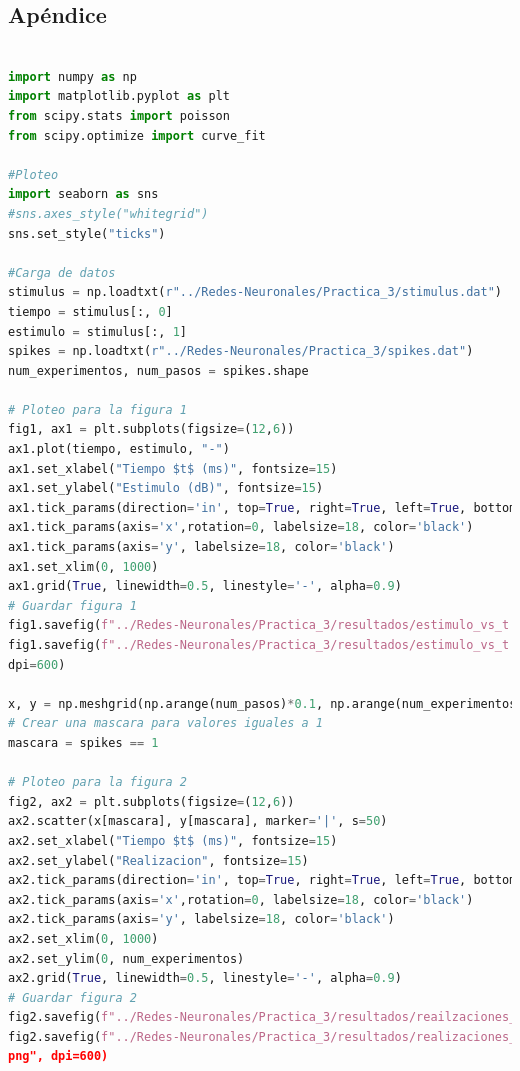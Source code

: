 \documentclass[11pt,twocolumn,twoside]{opticajnl}
\begin{document}
\begin{onecolumn} %
\appendix
\section{Apéndice \label{codigo}}

\begin{lstlisting}[language=Python, caption={Implementación del método Runge-Kutta 4.}, label=python-code]

import numpy as np
import matplotlib.pyplot as plt
from scipy.stats import poisson
from scipy.optimize import curve_fit

#Ploteo 
import seaborn as sns
#sns.axes_style("whitegrid")
sns.set_style("ticks")

#Carga de datos
stimulus = np.loadtxt(r"../Redes-Neuronales/Practica_3/stimulus.dat")
tiempo = stimulus[:, 0]
estimulo = stimulus[:, 1]
spikes = np.loadtxt(r"../Redes-Neuronales/Practica_3/spikes.dat")
num_experimentos, num_pasos = spikes.shape

# Ploteo para la figura 1
fig1, ax1 = plt.subplots(figsize=(12,6))
ax1.plot(tiempo, estimulo, "-")
ax1.set_xlabel("Tiempo $t$ (ms)", fontsize=15)
ax1.set_ylabel("Estimulo (dB)", fontsize=15)
ax1.tick_params(direction='in', top=True, right=True, left=True, bottom=True)
ax1.tick_params(axis='x',rotation=0, labelsize=18, color='black')
ax1.tick_params(axis='y', labelsize=18, color='black')
ax1.set_xlim(0, 1000)
ax1.grid(True, linewidth=0.5, linestyle='-', alpha=0.9)
# Guardar figura 1
fig1.savefig(f"../Redes-Neuronales/Practica_3/resultados/estimulo_vs_t.pdf")
fig1.savefig(f"../Redes-Neuronales/Practica_3/resultados/estimulo_vs_t.png",
dpi=600)

x, y = np.meshgrid(np.arange(num_pasos)*0.1, np.arange(num_experimentos))
# Crear una mascara para valores iguales a 1
mascara = spikes == 1

# Ploteo para la figura 2
fig2, ax2 = plt.subplots(figsize=(12,6)) 
ax2.scatter(x[mascara], y[mascara], marker='|', s=50)
ax2.set_xlabel("Tiempo $t$ (ms)", fontsize=15)
ax2.set_ylabel("Realizacion", fontsize=15)
ax2.tick_params(direction='in', top=True, right=True, left=True, bottom=True)
ax2.tick_params(axis='x',rotation=0, labelsize=18, color='black')
ax2.tick_params(axis='y', labelsize=18, color='black')
ax2.set_xlim(0, 1000)
ax2.set_ylim(0, num_experimentos)
ax2.grid(True, linewidth=0.5, linestyle='-', alpha=0.9)
# Guardar figura 2
fig2.savefig(f"../Redes-Neuronales/Practica_3/resultados/reailzaciones_vs_t.pdf")
fig2.savefig(f"../Redes-Neuronales/Practica_3/resultados/realizaciones_vs_t.
png", dpi=600)


\end{lstlisting}
\end{onecolumn}
\end{document}
